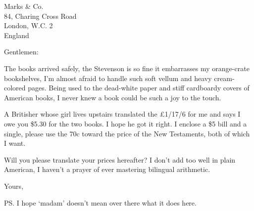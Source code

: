 \documentclass{letter}
\date{Novemver 3, 1949}
\begin{document}
\begin{letter}{Marks \& Co.\\84, Charing Cross Road\\London, W.C. 2\\England}
\opening{Gentlemen:}

The books arrived safely, the Stevenson is so fine it embarrasses my orange-crate bookshelves, I'm almost afraid to handle such soft vellum and heavy cream-colored pages. Being used to the dead-white paper and stiff cardboardy covers of American books, I never knew a book could be such a joy to the touch.

A Britisher whose girl lives upstairs translated the \pounds 1/17/6 for me and says I owe you \$5.30 for the two books. I hope he got it right. I enclose a \$5 bill and a single, please use the 70c toward the price of the New Testaments, both of which I want.

Will you please translate your prices hereafter? I don't add too well in plain American, I haven't a prayer of ever mastering bilingual arithmetic.

\closing{Yours,}

\ps
I hope `madam' doesn't mean over there what it does here.

\end{letter}
\end{document}
